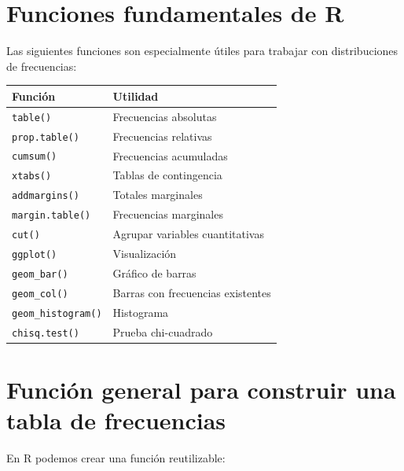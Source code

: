 \documentclass[
  spanish,
  14pt,
  letterpaper,
  DIV=11,
  numbers=noendperiod]{scrartcl}
\newcounter{none} %
\begin{document}
\section{Funciones fundamentales de
R}\label{funciones-fundamentales-de-r}

Las siguientes funciones son especialmente útiles para trabajar con
distribuciones de frecuencias:

{\def\LTcaptype{none} %
\begin{longtable}[]{@{}ll@{}}
\toprule\noalign{}
Función & Utilidad \\
\midrule\noalign{}
\endhead
\bottomrule\noalign{}
\endlastfoot
\texttt{table()} & Frecuencias absolutas \\
\texttt{prop.table()} & Frecuencias relativas \\
\texttt{cumsum()} & Frecuencias acumuladas \\
\texttt{xtabs()} & Tablas de contingencia \\
\texttt{addmargins()} & Totales marginales \\
\texttt{margin.table()} & Frecuencias marginales \\
\texttt{cut()} & Agrupar variables cuantitativas \\
\texttt{ggplot()} & Visualización \\
\texttt{geom\_bar()} & Gráfico de barras \\
\texttt{geom\_col()} & Barras con frecuencias existentes \\
\texttt{geom\_histogram()} & Histograma \\
\texttt{chisq.test()} & Prueba chi-cuadrado \\
\end{longtable}
}

\section{Función general para construir una tabla de
frecuencias}\label{funciuxf3n-general-para-construir-una-tabla-de-frecuencias}

En R podemos crear una función reutilizable:
\end{document}
